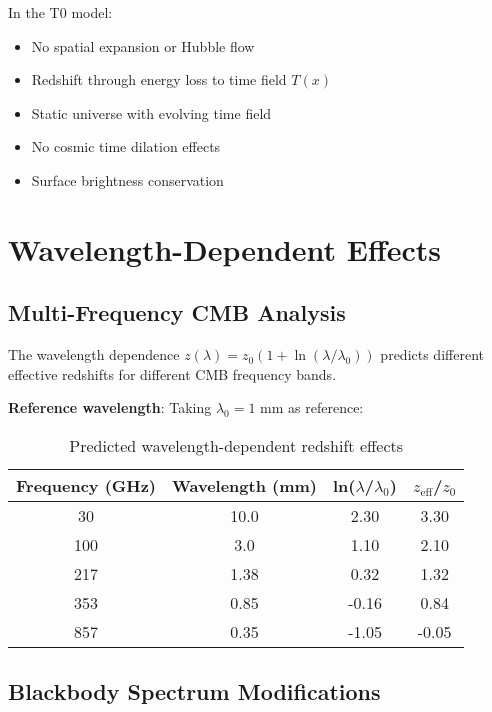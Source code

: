 \documentclass[12pt,a4paper]{article}
\newcommand{\Tfield}{T(x)}
\begin{document}
	\begin{tcolorbox}[colback=blue!5!white,colframe=blue!75!black,title=Fundamental Paradigm Difference]
		In the T0 model:
		\begin{itemize}
			\item No spatial expansion or Hubble flow
			\item Redshift through energy loss to time field $\Tfield$
			\item Static universe with evolving time field
			\item No cosmic time dilation effects
			\item Surface brightness conservation
		\end{itemize}
	\end{tcolorbox}
	
	\section{Wavelength-Dependent Effects}
	\label{sec:wavelength_effects}
	
	\subsection{Multi-Frequency CMB Analysis}
	\label{subsec:multi_frequency}
	
	The wavelength dependence $z(\lambda) = z_0(1 + \ln(\lambda/\lambda_0))$ predicts different effective redshifts for different CMB frequency bands.
	
	\textbf{Reference wavelength}: Taking $\lambda_0 = 1$ mm as reference:
	
	\begin{table}[htbp]
		\centering
		\begin{tabular}{|c|c|c|c|}
			\hline
			\textbf{Frequency (GHz)} & \textbf{Wavelength (mm)} & \textbf{ln($\lambda$/$\lambda_0$)} & \textbf{$z_{\text{eff}}$/$z_0$} \\
			\hline
			30 & 10.0 & 2.30 & 3.30 \\
			100 & 3.0 & 1.10 & 2.10 \\
			217 & 1.38 & 0.32 & 1.32 \\
			353 & 0.85 & -0.16 & 0.84 \\
			857 & 0.35 & -1.05 & -0.05 \\
			\hline
		\end{tabular}
		\caption{Predicted wavelength-dependent redshift effects}
	\end{table}
	
	\subsection{Blackbody Spectrum Modifications}
	\label{subsec:blackbody_modifications}
	
\end{document}
